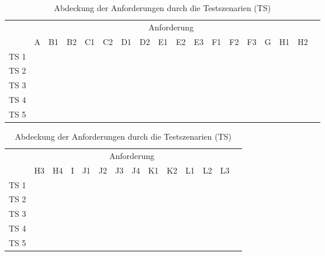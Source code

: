 \begin{table}[htb]
\caption[Abdeckung der Anforderungen durch die Testszenarien]{Abdeckung der Anforderungen durch die Testszenarien (TS)}
\label{tab:anforderungs_abdeckung}
\centering
\begin{tabular}{|r|c|c|c|c|c|c|c|c|c|c|c|c|c|c|c|c|c|}
	\cline{2-17}
	\multicolumn{1}{r|}{} & \multicolumn{16}{|c|}{Anforderung} \\ \cline{2-17}
	\multicolumn{1}{r|}{} & A & B1 & B2 & C1 & C2 & D1 & D2 & E1 & E2 & E3 & F1 & F2 & F3 & G & H1 & H2\\ \hline
	TS 1 & \Checkmark & \Checkmark &  & \Checkmark & \Checkmark & \Checkmark & \Checkmark & \Checkmark & \Checkmark & \Checkmark & \Checkmark & \Checkmark & \Checkmark & & \Checkmark & \Checkmark \\ \hline
	TS 2 & \Checkmark & \Checkmark & & \Checkmark & \Checkmark & & & \Checkmark & & & \Checkmark & \Checkmark & \Checkmark & & & \Checkmark \\ \hline
	TS 3 & \Checkmark & \Checkmark & & \Checkmark & \Checkmark & & & \Checkmark & & & \Checkmark & & & & & \Checkmark \\ \hline
	TS 4 & \Checkmark & \Checkmark & \Checkmark & \Checkmark & \Checkmark & & \Checkmark & \Checkmark & & \Checkmark & \Checkmark & \Checkmark & \Checkmark & \Checkmark & & \\ \hline
	TS 5 & \Checkmark & \Checkmark & \Checkmark & \Checkmark & \Checkmark & & & \Checkmark & & & \Checkmark & \Checkmark & \Checkmark & \Checkmark & & \Checkmark \\ \hline
\end{tabular}

\vspace{2ex}

\begin{tabular}{|r|c|c|c|c|c|c|c|c|c|c|c|c|c|}
	\cline{2-13}
	\multicolumn{1}{r|}{} & \multicolumn{12}{|c|}{Anforderung} \\ \cline{2-13}
	\multicolumn{1}{r|}{} & H3 & H4 & I & J1 & J2 & J3 & J4 & K1 & K2 & L1 & L2 & L3 \\ \hline
	TS 1 & & & & & \Checkmark & & & & & & & \\ \hline
	TS 2 & \Checkmark & \Checkmark & \Checkmark & & \Checkmark & & & \Checkmark & \Checkmark & & & \\ \hline
	TS 3 & & & & & & \Checkmark & \Checkmark & & \Checkmark & & & \\ \hline
	TS 4 & & & & \Checkmark & & & & & & \Checkmark & \Checkmark & \Checkmark \\ \hline
	TS 5 & & & & \Checkmark & \Checkmark & \Checkmark & \Checkmark & \Checkmark & \Checkmark & \Checkmark & \Checkmark & \Checkmark \\ \hline
\end{tabular}
\end{table}

